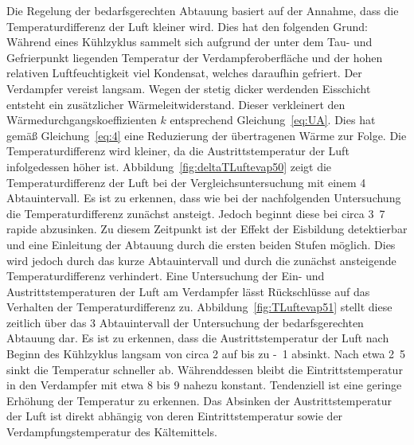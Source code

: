 Die Regelung der bedarfsgerechten Abtauung basiert auf der Annahme, dass die Temperaturdifferenz der Luft kleiner wird. Dies hat den folgenden Grund:
Während eines Kühlzyklus sammelt sich aufgrund der unter dem Tau- und Gefrierpunkt liegenden Temperatur der Verdampferoberfläche und der hohen relativen Luftfeuchtigkeit viel Kondensat, welches daraufhin gefriert. Der Verdampfer vereist langsam. Wegen der stetig dicker werdenden Eisschicht entsteht ein zusätzlicher Wärmeleitwiderstand. Dieser verkleinert den Wärmedurchgangskoeffizienten $k$ entsprechend Gleichung~\ref{eq:UA}. Dies hat gemäß Gleichung~\ref{eq:4} eine Reduzierung der übertragenen Wärme zur Folge. Die Temperaturdifferenz wird kleiner, da die Austrittstemperatur der Luft infolgedessen höher ist. \newline
Abbildung~\ref{fig:deltaTLuftevap50} zeigt die Temperaturdifferenz der Luft bei der Vergleichsuntersuchung mit einem \unit{4}{\hour} Abtauintervall. Es ist zu erkennen, dass wie bei der nachfolgenden Untersuchung die Temperaturdifferenz zunächst ansteigt. Jedoch beginnt diese bei circa \unit{3.7}{\hour} rapide abzusinken. Zu diesem Zeitpunkt ist der Effekt der Eisbildung detektierbar und eine Einleitung der Abtauung durch die ersten beiden Stufen möglich. Dies wird jedoch durch das kurze Abtauintervall und durch die zunächst ansteigende Temperaturdifferenz verhindert. \newline 
Eine Untersuchung der Ein- und Austrittstemperaturen der Luft am Verdampfer lässt Rückschlüsse auf das Verhalten der Temperaturdifferenz zu.
Abbildung~\ref{fig:TLuftevap51} stellt diese zeitlich über das \unit{3}{\hour} Abtauintervall der Untersuchung der bedarfsgerechten Abtauung dar.
Es ist zu erkennen, dass die Austrittstemperatur der Luft nach Beginn des Kühlzyklus  langsam von circa \unit{2}{\celsius} auf bis zu \unit{-1}{\celsius} absinkt. Nach etwa \unit{2.5}{\hour} sinkt die Temperatur schneller ab. Währenddessen bleibt die Eintrittstemperatur in den Verdampfer mit etwa \unit{8}{\celsius} bis \unit{9}{\celsius} nahezu konstant. Tendenziell ist eine geringe Erhöhung der Temperatur zu erkennen. Das Absinken der Austrittstemperatur der Luft ist direkt abhängig von deren Eintrittstemperatur sowie der Verdampfungstemperatur des Kältemittels.

